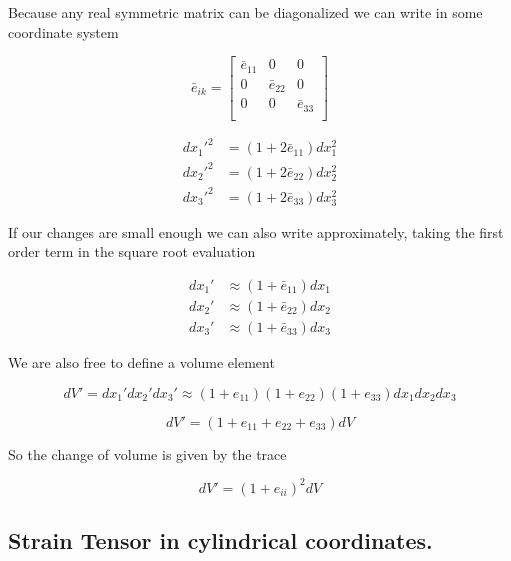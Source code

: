 Because any real symmetric matrix can be diagonalized we can write in some coordinate system

\begin{equation}\label{eqn:continuumL2:n}
\bar{e}_{ik} = 
\begin{bmatrix}
\bar{e}_{11} & 0 & 0 \\
0 & \bar{e}_{22} & 0 \\
0 & 0 & \bar{e}_{33} \\
\end{bmatrix}
\end{equation}

\begin{align}\label{eqn:continuumL2:n}
{dx_1'}^2 &= (1 + 2 \bar{e}_{11}) dx_1^2 \\
{dx_2'}^2 &= (1 + 2 \bar{e}_{22}) dx_2^2 \\
{dx_3'}^2 &= (1 + 2 \bar{e}_{33}) dx_3^2
\end{align}

If our changes are small enough we can also write approximately, taking the first order term in the square root evaluation

\begin{align}\label{eqn:continuumL2:n}
dx_1' &\approx (1 + \bar{e}_{11}) dx_1 \\
dx_2' &\approx (1 + \bar{e}_{22}) dx_2 \\
dx_3' &\approx (1 + \bar{e}_{33}) dx_3
\end{align}

We are also free to define a volume element

\begin{equation}\label{eqn:continuumL2:n}
dV' = 
dx_1'
dx_2'
dx_3'
\approx
(1 + e_{11})
(1 + e_{22})
(1 + e_{33})
dx_1 dx_2 dx_3
\end{equation}

\begin{equation}\label{eqn:continuumL2:n}
dV' = (1 + e_{11} +e_{22} +e_{33} ) dV
\end{equation}

So the change of volume is given by the trace

\begin{equation}\label{eqn:continuumL2:n}
dV' = ( 1 + e_{ii} )^2 dV
\end{equation}

\subsection{Strain Tensor in cylindrical coordinates.}


